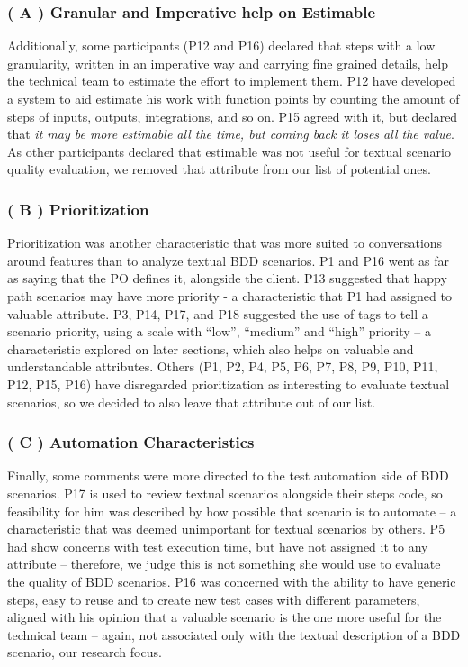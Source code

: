 \subsubsection{\textbf{( A ) Granular and Imperative help on Estimable}}
Additionally, some participants (P12 and P16) declared that steps with a low granularity, written in an imperative way and carrying fine grained details, help the technical team to estimate the effort to implement them. P12 have developed a system to aid estimate his work with function points \cite{Pressman_2009} by counting the amount of steps of inputs, outputs, integrations, and so on. P15 agreed with it, but declared that \textit{it may be more estimable all the time, but coming back it loses all the value}. As other participants declared that estimable was not useful for textual scenario quality evaluation, we removed that attribute from our list of potential ones.

\subsubsection{\textbf{( B ) Prioritization}}
Prioritization was another characteristic that was more suited to conversations around features than to analyze textual BDD scenarios. P1 and P16 went as far as saying that the PO defines it, alongside the client. P13 suggested that happy path scenarios may have more priority - a characteristic that P1 had assigned to valuable attribute. P3, P14, P17, and P18 suggested the use of tags to tell a scenario priority, using a scale with ``low'', ``medium'' and ``high'' priority -- a characteristic explored on later sections, which also helps on valuable and understandable attributes. Others (P1, P2, P4, P5, P6, P7, P8, P9, P10, P11, P12, P15, P16) have disregarded prioritization as interesting to evaluate textual scenarios, so we decided to also leave that attribute out of our list. 

\subsubsection{\textbf{( C ) Automation Characteristics}}
Finally, some comments were more directed to the test automation side of BDD scenarios. P17 is used to review textual scenarios alongside their steps code, so feasibility for him was described by how possible that scenario is to automate -- a characteristic that was deemed unimportant for textual scenarios by others. P5 had show concerns with test execution time, but have not assigned it to any attribute -- therefore, we judge this is not something she would use to evaluate the quality of BDD scenarios. P16 was concerned with the ability to have generic steps, easy to reuse and to create new test cases with different parameters, aligned with his opinion that a valuable scenario is the one more useful for the technical team -- again, not associated only with the textual description of a BDD scenario, our research focus. 

